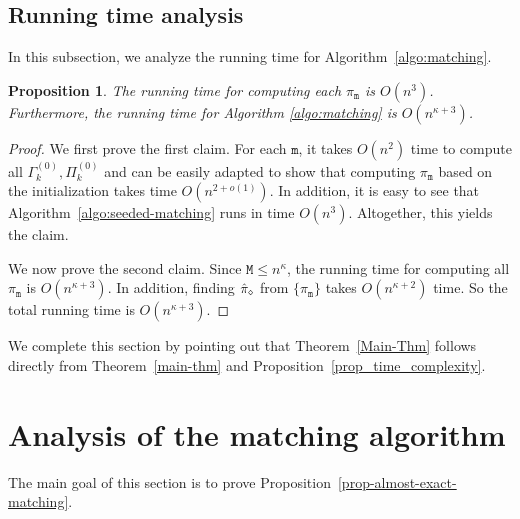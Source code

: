 \documentclass[11pt]{article}
\newtheorem{Proposition}[Theorem]{Proposition}
\numberwithin{equation}{section}
\begin{document}
\subsection{Running time analysis}
\label{sec:runtime-analysis}
In this subsection, we analyze the running time for Algorithm~\ref{algo:matching}. 
\begin{Proposition}{\label{prop_time_complexity}}
     The running time for computing each $\pi_{\mathtt m}$ is $O(n^{3})$. Furthermore, the running time for Algorithm \ref{algo:matching}  is $O(n^{\kappa+3})$.
\end{Proposition}
\begin{proof} 
We first prove the first claim. For each $\mathtt{m}$, it takes $O(n^2)$ time to compute all $\Gamma^{(0)}_k, \Pi^{(0)}_k$ and \cite[Proposition 2.13] {DL22+} can be easily adapted to show that computing $\pi_{\mathtt{m}}$ based on the initialization takes time $O(n^{2+o(1)})$. In addition, it is easy to see that Algorithm~\ref{algo:seeded-matching} runs in time $O(n^3)$. Altogether, this yields the claim.

We now prove the second claim. Since $\mathtt M \leq n^{\kappa}$, the running time for computing all $\pi_{\mathtt{m}}$ is $O(n^{\kappa+3})$. In addition, finding $\Hat{\pi}_\diamond$ from $\{ \pi_{\mathtt{m}} \}$ takes $O(n^{\kappa+2})$ time. So the total running time is $O(n^{\kappa+3})$.
\end{proof}

We complete this section by pointing out that Theorem~\ref{Main-Thm} follows directly from Theorem~\ref{main-thm} and Proposition~\ref{prop_time_complexity}.







\section{Analysis of the matching algorithm}
\label{sec:analysis}
The main goal of this section is to prove Proposition~\ref{prop-almost-exact-matching}.
\end{document}
